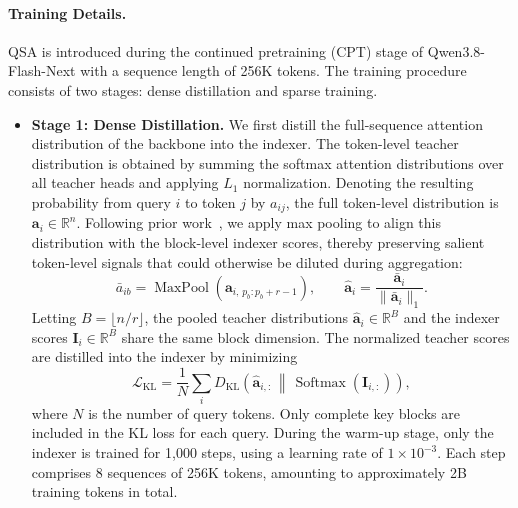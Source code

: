 \paragraph{Training Details.}
QSA is introduced during the continued pretraining (CPT) stage of
Qwen3.8-Flash-Next with a sequence length of 256K tokens.
The training procedure consists of two stages: dense distillation and sparse training.
\begin{itemize}[leftmargin=1.5em]
\item \textbf{Stage 1: Dense Distillation.}
We first distill the full-sequence attention distribution of the backbone into the indexer.
The token-level teacher distribution is obtained by summing the softmax attention distributions over all teacher heads and applying $L_1$ normalization.
Denoting the resulting probability from query $i$ to token $j$ by $a_{ij}$, the full token-level distribution is $\mathbf{a}_i\in\mathbb{R}^{n}$.
Following prior work~\citep{gao2024seerattention,wang2026proxyattn},
we apply max pooling to align this distribution with the block-level indexer scores, 
thereby preserving salient token-level signals that could otherwise be diluted during aggregation:
\begin{equation}
\bar{a}_{ib}
= \operatorname{MaxPool}(\mathbf{a}_{i,\,p_b:p_b+r-1}),
\qquad
\hat{\mathbf{a}}_{i}
= \frac{\bar{\mathbf{a}}_{i}}
{\lVert\bar{\mathbf{a}}_{i}\rVert_1}.
\label{eq:qsa-teacher-pooling}
\end{equation}
Letting $B=\lfloor n/r\rfloor$, the pooled teacher distributions $\hat{\mathbf{a}}_i\in\mathbb{R}^{B}$ and the indexer scores $\mathbf{I}_i\in\mathbb{R}^{B}$ share the same block dimension.
The normalized teacher scores are distilled into the indexer by minimizing
\begin{equation}
\mathcal{L}_{\mathrm{KL}}
= \frac{1}{N}\sum_i
  D_{\mathrm{KL}}\left(
      \hat{\mathbf{a}}_{i,:}
      \,\middle\Vert\,
      \operatorname{Softmax}(\mathbf{I}_{i,:})
  \right),
\label{eq:qsa-distillation-loss}
\end{equation}
where $N$ is the number of query tokens. Only complete key blocks are included in the KL loss for each query.
During the warm-up stage, only the indexer is trained for 1,000 steps, using a learning rate of $1\times10^{-3}$.
Each step comprises $8$ sequences of 256K tokens, amounting to approximately 2B training tokens in total.


\end{itemize}
